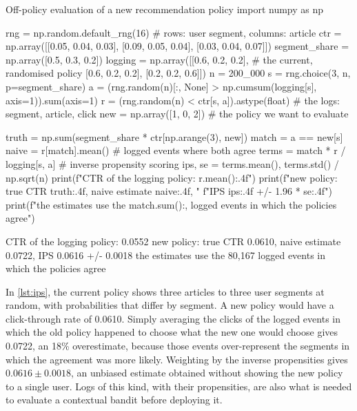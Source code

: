 \begin{pylisting}[label={lst:ips}]{Off-policy evaluation of a new recommendation policy}
import numpy as np

rng = np.random.default_rng(16)
# rows: user segment, columns: article
ctr = np.array([[0.05, 0.04, 0.03],
                [0.09, 0.05, 0.04],
                [0.03, 0.04, 0.07]])
segment_share = np.array([0.5, 0.3, 0.2])
logging = np.array([[0.6, 0.2, 0.2],                 # the current, randomised policy
                    [0.6, 0.2, 0.2],
                    [0.2, 0.2, 0.6]])
n = 200_000
s = rng.choice(3, n, p=segment_share)
a = (rng.random(n)[:, None] > np.cumsum(logging[s], axis=1)).sum(axis=1)
r = (rng.random(n) < ctr[s, a]).astype(float)         # the logs: segment, article, click
new = np.array([1, 0, 2])                            # the policy we want to evaluate

truth = np.sum(segment_share * ctr[np.arange(3), new])
match = a == new[s]
naive = r[match].mean()                              # logged events where both agree
terms = match * r / logging[s, a]                    # inverse propensity scoring
ips, se = terms.mean(), terms.std() / np.sqrt(n)
print(f"CTR of the logging policy: {r.mean():.4f}")
print(f"new policy: true CTR {truth:.4f}, naive estimate {naive:.4f}, "
      f"IPS {ips:.4f} +/- {1.96 * se:.4f}")
print(f"the estimates use the {match.sum():,} logged events in which the policies agree")
\end{pylisting}
\begin{pyoutput}
CTR of the logging policy: 0.0552
new policy: true CTR 0.0610, naive estimate 0.0722, IPS 0.0616 +/- 0.0018
the estimates use the 80,167 logged events in which the policies agree
\end{pyoutput}

In \cref{lst:ips}, the current policy shows three articles to three user segments at random, with probabilities that differ by segment. A
new policy would have a click-through rate of 0.0610. Simply averaging the clicks of the logged events in which the old policy happened
to choose what the new one would choose gives 0.0722, an 18\% overestimate, because those events over-represent the segments in which
the agreement was more likely. Weighting by the inverse propensities gives $0.0616\pm0.0018$, an unbiased estimate obtained without showing
the new policy to a single user. Logs of this kind, with their propensities, are also what is needed to evaluate a contextual bandit before deploying it.

